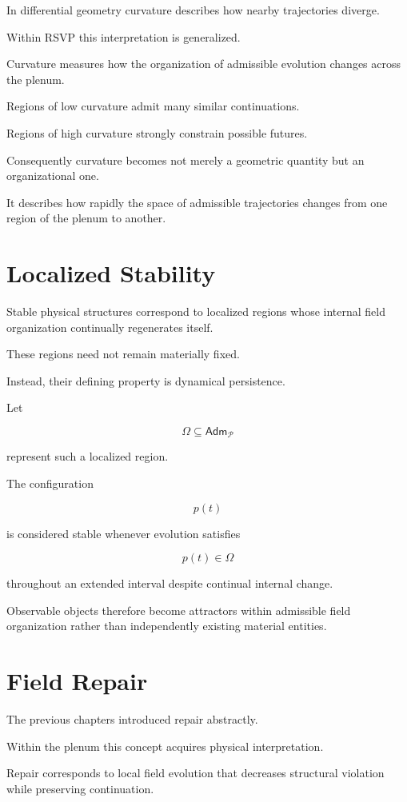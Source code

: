 \documentclass[11pt,oneside]{book}
\numberwithin{equation}{chapter}
\theoremstyle{definition}
\theoremstyle{plain}
\newcommand{\Adm}{\mathsf{Adm}}
\begin{document}
In differential geometry curvature describes how nearby trajectories
diverge.

Within RSVP this interpretation is generalized.

Curvature measures how the organization of admissible evolution changes
across the plenum.

Regions of low curvature admit many similar continuations.

Regions of high curvature strongly constrain possible futures.

Consequently curvature becomes not merely a geometric quantity but an
organizational one.

It describes how rapidly the space of admissible trajectories changes from
one region of the plenum to another.

\section{Localized Stability}

Stable physical structures correspond to localized regions whose internal
field organization continually regenerates itself.

These regions need not remain materially fixed.

Instead, their defining property is dynamical persistence.

Let

\[
\Omega
\subseteq
\Adm_{\mathcal P}
\]

represent such a localized region.

The configuration

\[
p(t)
\]

is considered stable whenever evolution satisfies

\[
p(t)
\in
\Omega
\]

throughout an extended interval despite continual internal change.

Observable objects therefore become attractors within admissible field
organization rather than independently existing material entities.

\section{Field Repair}

The previous chapters introduced repair abstractly.

Within the plenum this concept acquires physical interpretation.

Repair corresponds to local field evolution that decreases structural
violation while preserving continuation.
\end{document}
